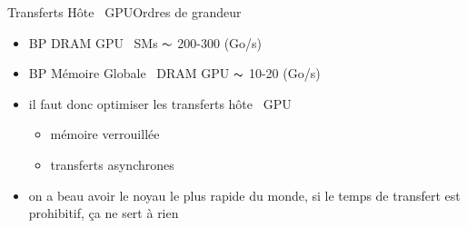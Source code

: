 \documentclass[11pt,mathserif]{beamer}
\newcommand{\scout}{\faAngellist}
\newcommand{\argi}{\faLightbulbO}
\newcommand{\kontuz}{\faExclamationTriangle}
\newcommand{\harritu}{\faExclamation}
\newcommand{\geziBikoitz}{\faArrowsH}
\begin{document}
\begin{frame}{Transferts Hôte \geziBikoitz\  GPU}{Ordres de grandeur}
  \begin{itemize}[<+->]
    \item[\argi] BP DRAM GPU \geziBikoitz\ SMs $\thicksim$ 200-300 (Go/s)
    \item[\argi] BP Mémoire Globale \geziBikoitz\ DRAM GPU $\thicksim$ 10-20 (Go/s)
    \item[\scout] il faut donc optimiser les transferts hôte \geziBikoitz\ GPU
      \begin{itemize}
        \item mémoire verrouillée
        \item transferts asynchrones
      \end{itemize}
    \item[\kontuz] on a beau avoir le noyau le plus rapide du monde, si le temps de transfert est prohibitif, ça ne sert à rien \harritu
  \end{itemize}
\end{frame}
\end{document}
